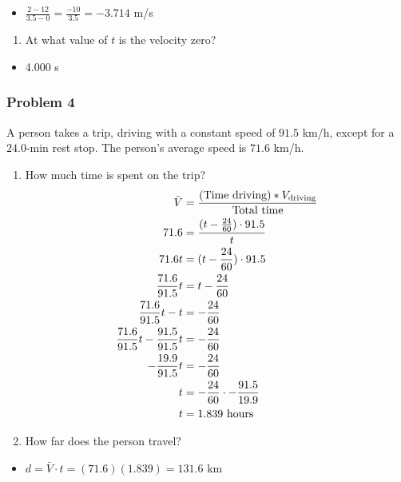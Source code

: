 \documentclass[
  letterpaper,
  DIV=11,
  numbers=noendperiod]{scrartcl}
\providecommand{\tightlist}{%
  \setlength{\itemsep}{0pt}\setlength{\parskip}{0pt}}\usepackage{longtable,booktabs,array}
\begin{document}
\begin{itemize}
\tightlist
\item
  \(\frac{2-12}{3.5-0} = \frac{-10}{3.5} = -3.714\) m/s
\end{itemize}

\begin{enumerate}
\def\labelenumi{(\alph{enumi})}
\setcounter{enumi}{2}
\tightlist
\item
  At what value of \(t\) is the velocity zero?
\end{enumerate}

\begin{itemize}
\tightlist
\item
  4.000 s
\end{itemize}

\newpage{}

\hypertarget{problem-4}{%
\subsubsection{Problem 4}\label{problem-4}}

A person takes a trip, driving with a constant speed of \(91.5\) km/h,
except for a \(24.0\)-min rest stop. The person's average speed is
\(71.6\) km/h.

\begin{enumerate}
\def\labelenumi{(\alph{enumi})}
\tightlist
\item
  How much time is spent on the trip? \begin{align*}
  \bar{V} &= \frac{(\text{Time driving})*V_\text{driving}}{\text{Total time}} \\
  71.6 &= \cfrac{(t-\frac{24}{60})\cdot 91.5}{t} \\
  71.6t &= (t-\frac{24}{60})\cdot 91.5 \\
  \frac{71.6}{91.5}t &= t-\frac{24}{60} \\
  \frac{71.6}{91.5}t - t &= -\frac{24}{60} \\
  \frac{71.6}{91.5}t - \frac{91.5}{91.5}t &= -\frac{24}{60} \\
  -\frac{19.9}{91.5}t &= -\frac{24}{60} \\
  t &= -\frac{24}{60}\cdot -\frac{91.5}{19.9} \\
  t &= 1.839 \text{ hours}
  \end{align*}
\item
  How far does the person travel?
\end{enumerate}

\begin{itemize}
\tightlist
\item
  \(d = \bar{V}\cdot t = (71.6)(1.839) = 131.6\) km
\end{itemize}
\end{document}
